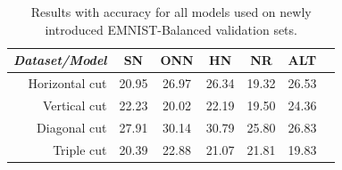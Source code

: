 \documentclass[b5paper]{book}
\begin{document}
\begin{table}[ht]
  \centering
  \begin{tabular}{rS[table-format=2.1]S[table-format=2.1]S[table-format=2.1]S[table-format=2.1]S[table-format=2.1]S[table-format=2.1]}
    \toprule
     \textit{Dataset/Model} & SN & ONN & HN & NR & ALT \\
    \midrule
    {Horizontal cut} & {20.95} & {26.97} & {26.34} & {19.32} & {26.53} \\
    {Vertical cut} & {22.23} & {20.02} & {22.19} & {19.50} & {24.36} \\
    {Diagonal cut} & {27.91} & {30.14} & {30.79} & {25.80} & {26.83} \\
    {Triple cut} & {20.39} & {22.88} & {21.07} & {21.81} & {19.83} \\
    
    \bottomrule
  \end{tabular}
  \caption{Results with accuracy for all models used on newly introduced EMNIST-Balanced validation sets.}
  \label{tab:results-emnist}
\end{table} 
\end{document}
